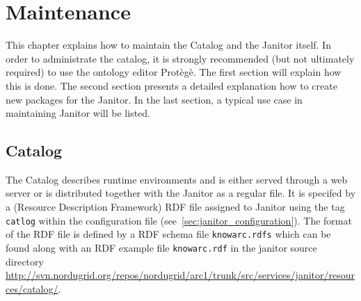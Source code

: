 \chapter{Maintenance}

This chapter explains how to maintain the Catalog and the Janitor itself. 
In order to administrate the catalog, it is strongly recommended (but not ultimately required) to use the ontology editor Prot\`eg\`e. The first
section will explain how this is done.
The second section presents a detailed explanation how to create new packages for the Janitor.
In the last section, a typical use case in maintaining Janitor will be listed.


\section{Catalog}\label{sec:catalog}



The Catalog describes runtime environments and is either served through a web server or is distributed together with the Janitor as a regular file. 
It is specifed by a (Resource Description Framework) RDF file assigned to 
Janitor using the tag \texttt{catlog} within the configuration file (see~\ref{sec:janitor_configuration}). 
The format of the RDF file is defined by a RDF schema file \texttt{knowarc.rdfs}
which can be found along with an RDF example file \texttt{knowarc.rdf} in the janitor source directory \href{http://svn.nordugrid.org/repos/nordugrid/arc1/trunk/src/services/janitor/resources/catalog/}
{http://svn.nordugrid.org/repos/nordugrid/arc1/trunk/src/services/janitor/resources/catalog/}.\\


